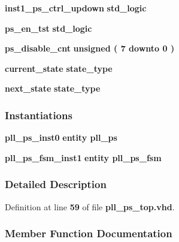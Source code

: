 \begin{DoxyCompactItemize}
\item 
{\bf inst1\+\_\+ps\+\_\+ctrl\+\_\+updown} {\bfseries \textcolor{comment}{std\+\_\+logic}\textcolor{vhdlchar}{ }} 
\item 
{\bf ps\+\_\+en\+\_\+tst} {\bfseries \textcolor{comment}{std\+\_\+logic}\textcolor{vhdlchar}{ }} 
\item 
{\bf ps\+\_\+disable\+\_\+cnt} {\bfseries \textcolor{comment}{unsigned}\textcolor{vhdlchar}{ }\textcolor{vhdlchar}{(}\textcolor{vhdlchar}{ }\textcolor{vhdlchar}{ } \textcolor{vhdldigit}{7} \textcolor{vhdlchar}{ }\textcolor{keywordflow}{downto}\textcolor{vhdlchar}{ }\textcolor{vhdlchar}{ } \textcolor{vhdldigit}{0} \textcolor{vhdlchar}{ }\textcolor{vhdlchar}{)}\textcolor{vhdlchar}{ }} 
\item 
{\bf current\+\_\+state} {\bfseries {\bfseries {\bf state\+\_\+type}} \textcolor{vhdlchar}{ }} 
\item 
{\bf next\+\_\+state} {\bfseries {\bfseries {\bf state\+\_\+type}} \textcolor{vhdlchar}{ }} 
\end{DoxyCompactItemize}
\subsubsection*{Instantiations}
 \begin{DoxyCompactItemize}
\item 
{\bf pll\+\_\+ps\+\_\+inst0}  {\bfseries entity pll\+\_\+ps}   
\item 
{\bf pll\+\_\+ps\+\_\+fsm\+\_\+inst1}  {\bfseries entity pll\+\_\+ps\+\_\+fsm}   
\end{DoxyCompactItemize}


\subsubsection{Detailed Description}


Definition at line {\bf 59} of file {\bf pll\+\_\+ps\+\_\+top.\+vhd}.



\subsubsection{Member Function Documentation}
